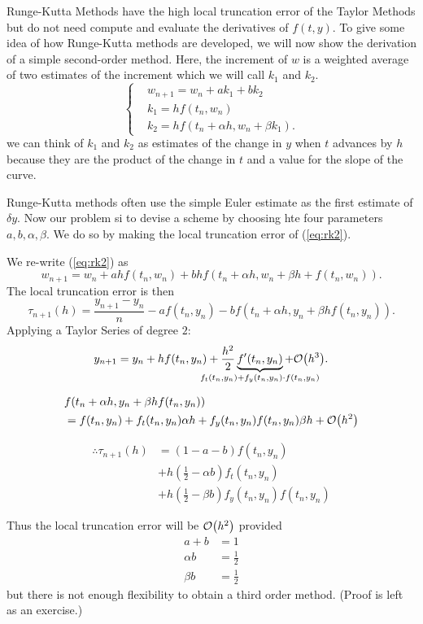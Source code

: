 \documentclass[12pt]{article}
\begin{document}
Runge-Kutta Methods have the high local truncation error of the Taylor Methods
but do not need compute and evaluate the derivatives of $f(t,y)$. To give some
idea of how Runge-Kutta methods are developed, we will now show the derivation
of a simple second-order method. Here, the increment of $w$ is a weighted
average of two estimates of the increment which we will call $k_1$ and $k_2$.
\[
\begin{cases}
  & w_{n+1} = w_n + ak_1 + bk_2 \\
  & k_1 = hf(t_n, w_n) \\
  & k_2 = hf(t_n + \alpha h, w_n + \beta k_1)
.\end{cases}
\label{eq:rk2}
\]
we can think of $k_1$ and $k_2$ as estimates of the change in $y$ when $t$
advances by $h$ because they are the product of the change in $t$ and a value
for the slope of the curve.

Runge-Kutta methods often use the simple Euler estimate as the first estimate
of $\delta y$. Now our problem si to devise a scheme by choosing hte four
parameters $a, b, \alpha, \beta$. We do so by making the local truncation error
of (\ref{eq:rk2}).

We re-write (\ref{eq:rk2}) as
\[
  w_{n+1} = w_n + ahf(t_n, w_n) + bhf(t_n+\alpha h, w_n+\beta h + f(t_n, w_n))
.\]
The local truncation error is then
\[
  \tau_{n+1}(h) = \frac{y_{n+1}-y_n}{n} - af(t_n,y_n) - bf(t_n+\alpha h, y_n +
  \beta hf(t_n, y_n))
.\]
Applying a Taylor Series of degree $2$:
\[
  y_{n+1} = y_n + h f(t_n, y_n) + \frac{h^2}{2} 
  \underbrace{f'(t_n, y_n)}_{\mathclap{f_t(t_n, y_n) + f_y(t_n, y_n) \cdot f(t_n, y_n)}} 
  + \order{h^3}.
\]

\begin{align*}
& f(t_n + \alpha h, y_n + \beta h f(t_n,y_n))  \\
&= f(t_n, y_n) + f_t(t_n,y_n) \alpha h + f_y(t_n, y_n) f(t_n,y_n) \beta h + 
\order{h^2} \\
\end{align*}

\begin{align*}
  \therefore \tau_{n+1} (h) &= (1-a-b) f(t_n,y_n) \\
                            &+ h(\frac{1}{2} -\alpha b) f_t(t_n,y_n) \\
                            &+ h(\frac{1}{2} - \beta b) f_y(t_n,y_n) f(t_n,y_n)
\end{align*}

Thus the local truncation error will be $\order{h^2}$ provided 
\begin{align*}
a+b &= 1 \\
\alpha b &= \frac{1}{2} \\
\beta b &= \frac{1}{2}
\end{align*}
but there is not enough flexibility to obtain a third order method. (Proof is
left as an exercise.)
\end{document}
